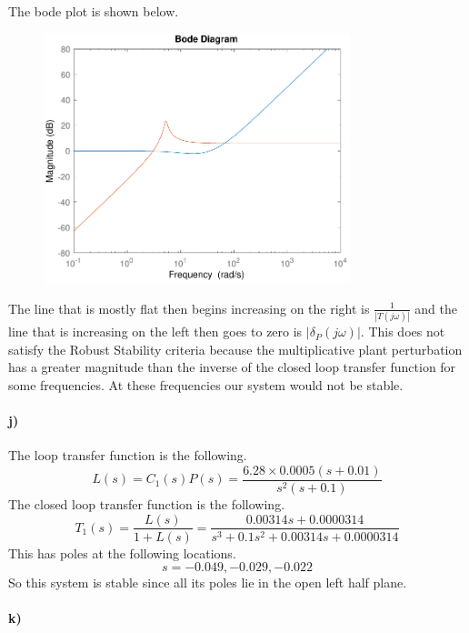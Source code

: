 \documentclass[12pt]{article}
\begin{document}
The bode plot is shown below.
\begin{figure}[H]
    \begin{center}
        \includegraphics[width=3.5in]{problem5i.pdf}
    \end{center}
\end{figure}
The line that is mostly flat then begins increasing on the right is \(\frac{1}{|T(j\omega)|}\)
and the line that is increasing on the left then goes to zero is \(|\delta_P(j\omega)|\).
This does not satisfy the Robust Stability criteria because the multiplicative plant
perturbation has a greater magnitude than the inverse of the closed loop transfer function
for some frequencies. At these frequencies our system would not be stable.

\paragraph{j)}

The loop transfer function is the following.
\[L(s)=C_1(s)P(s)=\frac{6.28\times0.0005(s+0.01)}{s^2(s+0.1)}\]
The closed loop transfer function is the following.
\[T_1(s)=\frac{L(s)}{1+L(s)}=\frac{0.00314s+0.0000314}{s^3+0.1s^2+0.00314s+0.0000314}\]
This has poles at the following locations.
\[s=-0.049, -0.029, -0.022\]
So this system is stable since all its poles lie in the open left half plane.

\paragraph{k)}
\end{document}
